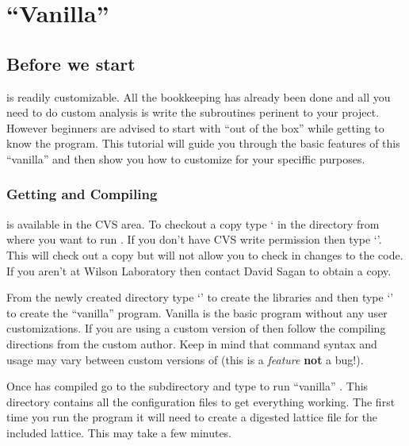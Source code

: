 \documentclass{report}
\begin{document}
\tableofcontents
\listoffigures

\setlength{\parskip}{\dPar}
\setlength{\parindent}{0ex}

\part{``Vanilla'' \tao}
\label{p:vanilla_tao}

\chapter{Before we start}
\label{c:before_beginning}

\tao is readily customizable. All the bookkeeping has already been done and all
you need to do custom analysis is write the subroutines perinent to your
project. However beginners are advised to start with
``out of the box'' \tao while getting to know the program. This tutorial will
guide you through the basic features of this ``vanilla'' \tao and then show you
how to customize \tao for your speciffic purposes.

\section{Getting and Compiling \tao}

\tao is available in the \cesr CVS area. To checkout a copy type ` in the directory from where you want to run \tao. If you don't have \cesr
CVS write permission then type `'. This will check out a copy
but will not allow you to check in changes to the code. If you aren't at Wilson
Laboratory then contact David Sagan  to obtain a copy. 

From the newly created  directory type `' to create the
libraries and then type `' to create
the ``vanilla'' \tao program. Vanilla \tao is the basic \tao program without any
user customizations. If you are using a custom version of \tao then
follow the compiling directions from the custom \tao author. Keep in mind that
command syntax and usage may vary between custom versions of \tao (this is a
\textit{feature} \textbf{not} a bug!).

Once \tao has compiled go to the subdirectory  and type
 to run ``vanilla'' \tao. This directory contains all the
configuration files to get everything working. The first time you run the
program it will need to create a digested \bmad lattice file for the included
lattice. This may take a few minutes.
\end{document}
